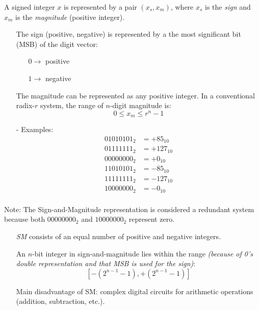 \documentclass[12pt,openany]{book}
\begin{document}
	A signed integer \( x \) is represented by a pair \( (x_s, x_m) \), where \( x_s \) is the \textit{sign} and \( x_m \) is the \textit{magnitude} (positive integer).
	
	\begin{itemize}
		\item[] The sign (positive, negative) is represented by a the most significant bit (MSB) of the digit vector:
		      \begin{itemize}
		      	\item[] \( 0 \rightarrow \) positive
		      	\item[] \( 1 \rightarrow \) negative
		      \end{itemize}
		\item[] The magnitude can be represented as any positive integer. In a conventional radix-\( r \) system, the range of \( n \)-digit magnitude is:
		      \[ 0 \leq x_m \leq r^n - 1 \]
	\end{itemize}
	
	\begin{itemize}
		\item[-] Examples:
		      \begin{align*}
		      	01010101_2 & = +85_{10}  \\
		      	01111111_2 & = +127_{10} \\
		      	00000000_2 & = +0_{10}   \\
		      	11010101_2 & = -85_{10}  \\
		      	11111111_2 & = -127_{10} \\
		      	10000000_2 & = -0_{10}   \\
		      \end{align*}
	\end{itemize}
	\newpage
	Note: The Sign-and-Magnitude representation is considered a redundant system because both \( 00000000_2 \) and \( 10000000_2 \) represent zero.
	
	\begin{itemize}
		\item[] \textit{SM} consists of an equal number of positive and negative integers.
		\item[] An \( n \)-bit integer in sign-and-magnitude lies within the range \textit{(because of 0's double representation and that MSB is used for the sign)}: 
		      $$ [-\left(2^{n-1} - 1\right), +\left(2^{n-1} - 1\right)] $$ 
		\item[] Main disadvantage of SM: complex digital circuits for arithmetic operations (addition, subtraction, etc.).
	\end{itemize}
	
\end{document}
